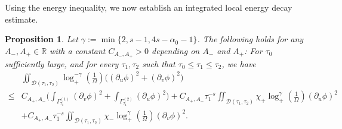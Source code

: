 \documentclass[10pt, reqno]{amsart}
\newtheorem{proposition}[theorem]{Proposition}
\theoremstyle{definition}
\theoremstyle{remark}
\numberwithin{equation}{section}
\newcommand{\rd}{\partial}
\newcommand{\bb}{\Big}
\newcommand{\0}{\emptyset}
\newcommand{\alp}{\alpha}
\newcommand{\Gmm}{\Gamma}
\newcommand{\Omg}{\Omega}
\newcommand{\calD}{\mathcal D}
\newcommand{\f}{\frac}
\begin{document}
Using the energy inequality, we now establish an integrated local energy decay estimate.
\begin{proposition} \label{prop:intr:ILED}
Let $\gamma:=\min\{2, s-1, 4s-\alp_0-1\}$. The following holds for any $A_-, A_+\in \mathbb R$ with a constant $C_{A_-,A_+}>0$ depending on $A_-$ and $A_+$: For $\tau_0$ sufficiently large, and for every $\tau_{1}, \tau_{2}$ such that $\tau_0 \leq \tau_{1} \leq \tau_{2}$, we have
\begin{equation} \label{eq:intr:ILED}
\begin{split}
	&\iint_{\calD(\tau_{1}, \tau_{2})} \log_+^{-\gamma}(\f 1{\Omg}) \bb( (\rd_{u} \phi)^{2} + (\rd_{v} \phi)^{2} \bb)\\
	\leq &C_{A_+,A_-} \bb( \int_{\Gmm^{(1)}_{\tau_{1}}} (\rd_{v} \phi)^{2} + \int_{\Gmm^{(2)}_{\tau_{1}}} (\rd_{u} \phi)^{2} \bb)+C_{A_+,A_-}\tau_1^{-s}\iint_{\calD(\tau_{1}, \tau_{2})} \chi_+\log_+^{\gamma}(\f{1}{\Omg})(\rd_u\phi)^2\\
	&+C_{A_+,A_-}\tau_1^{-s}\iint_{\calD(\tau_{1}, \tau_{2})} \chi_-\log_+^{\gamma}(\f{1}{\Omg})(\rd_v\phi)^2.
\end{split}
\end{equation}
\end{proposition}
\end{document}
